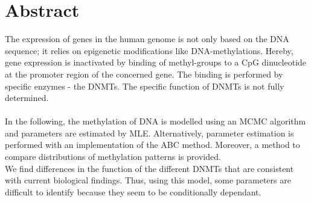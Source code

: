 \section*{Abstract}

The expression of genes in the human genome is not only based on the DNA sequence; it relies on epigenetic modifications like DNA-methylations. Hereby, gene expression is inactivated by binding of methyl-groups to a \ac{CpG} dinucleotide at the promoter region of the concerned gene. The binding is performed by specific enzymes - the \acp{DNMT}. The specific function of \acp{DNMT} is not fully determined.\\
\\
In the following, the methylation of DNA is modelled using an \ac{MCMC} algorithm and parameters are estimated by \ac{MLE}. Alternatively, parameter estimation is performed with an implementation of the \ac{ABC} method. Moreover, a method to compare distributions of methylation patterns is provided.\\
We find differences in the function of the different \acp{DNMT} that are consistent with current biological findings. Thus, using this model, some parameters are difficult to identify because they seem to be conditionally dependant.

\newpage
\mbox{}
\newpage